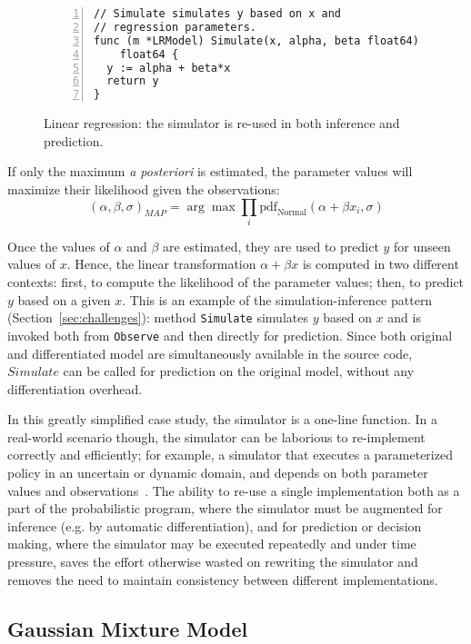 \documentclass[sigplan,review,10pt,anonymous]{acmart}
\begin{document}
\begin{sloppypar}
\begin{figure}
\begin{lstlisting}[framexleftmargin=10pt,numbers=left]
// Simulate simulates y based on x and 
// regression parameters.
func (m *LRModel) Simulate(x, alpha, beta float64)
    float64 {
  y := alpha + beta*x
  return y
}
\end{lstlisting}
\caption{Linear regression: the simulator is re-used in both
  inference and prediction.}
\label{fig:linear-regression}
\end{figure}
If only the maximum \textit{a posteriori} is estimated, the
parameter values will maximize their likelihood given the
observations:
\begin{equation}
	(\alpha, \beta, \sigma)_{MAP} = \arg \max \prod\limits_i \mathrm{pdf}_\mathrm{Normal}(\alpha + \beta x_i, \sigma)
	\label{eqn:linear-regression-2}
\end{equation}

Once the values of $\alpha$ and $\beta$ are estimated, they are
used to predict $y$ for unseen values of $x$. Hence, the linear
transformation $\alpha + \beta x$ is computed in two different
contexts: first, to compute the likelihood of the parameter
values; then, to predict $y$ based on a given $x$. This is an
example of the simulation-inference pattern
(Section~\ref{sec:challenges}): method \lstinline{Simulate}
simulates $y$ based on $x$ and is invoked both from
\lstinline{Observe} and then directly for prediction.  Since
both original and differentiated model are simultaneously
available in the source code, $Simulate$ can be called
for prediction on the original model, without any
differentiation overhead. 

In this greatly simplified case study, the simulator is a
one-line function. In a real-world scenario though, the
simulator can be laborious to re-implement correctly and
efficiently; for example, a simulator that executes a
parameterized policy in an uncertain or dynamic domain, and
depends on both parameter values and observations~\cite{MPT+16}.
The ability to re-use a single implementation both as a part of
the probabilistic program, where the simulator must be augmented
for inference (e.g. by automatic differentiation), and for
prediction or decision making, where the simulator may be
executed repeatedly and under time pressure, saves the effort
otherwise wasted on rewriting the simulator and removes the need
to maintain consistency between different implementations.

\subsection{Gaussian Mixture Model}
\label{sec:gaussian-mixture}


\end{sloppypar}
\end{document}
